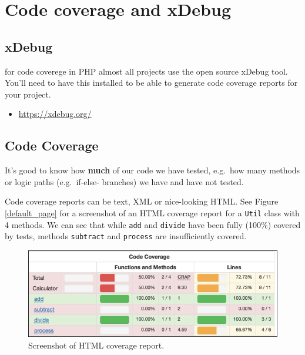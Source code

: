 \documentclass[a4paperpaper,openright]{book}
\providecommand{\tightlist}{%
  \setlength{\itemsep}{0pt}\setlength{\parskip}{0pt}}
\begin{document}
\hypertarget{code-coverage-and-xdebug}{%
\chapter{Code coverage and xDebug}\label{code-coverage-and-xdebug}}

\hypertarget{xdebug}{%
\section{xDebug}\label{xdebug}}

for code coverege in PHP almost all projects use the open source xDebug
tool. You'll need to have this installed to be able to generate code
coverage reports for your project.

\begin{itemize}
\tightlist
\item
  \url{https://xdebug.org/}
\end{itemize}

\hypertarget{code-coverage}{%
\section{Code Coverage}\label{code-coverage}}

It's good to know how \textbf{much} of our code we have tested, e.g.~how
many methods or logic paths (e.g.~if-else- branches) we have and have
not tested.

Code coverage reports can be text, XML or nice-looking HTML. See Figure
\ref{default_page} for a screenshot of an HTML coverage report for a
\texttt{Util} class with 4 methods. We can see that while \texttt{add}
and \texttt{divide} have been fully (100\%) covered by tests, methods
\texttt{subtract} and \texttt{process} are insufficiently covered.

\begin{figure}
\centering
\includegraphics{./tex2pdf.-05a85d9d563be472/093ea6f2954df63fe293cf27e03e06b550d6c326.png}
\caption{Screenshot of HTML coverage report. \label{coverage_html}}
\end{figure}
\end{document}
